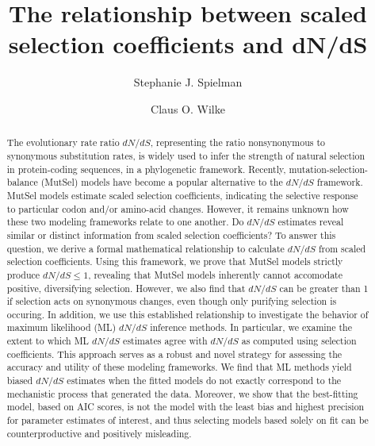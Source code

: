\documentclass[11pt]{article}
\begin{document}
	
	
\title{The relationship between scaled selection coefficients and dN/dS}
	
\author{Stephanie J. Spielman 
	\and
	Claus O. Wilke
}
	

		
\begin{abstract} 
The evolutionary rate ratio $dN/dS$, representing the ratio nonsynonymous to synonymous substitution rates, is widely used to infer the strength of natural selection in protein-coding sequences, in a phylogenetic framework.  Recently, mutation-selection-balance (MutSel) models have become a popular alternative to the $dN/dS$ framework. MutSel models estimate scaled selection coefficients, indicating the selective response to particular codon and/or amino-acid changes. However, it remains unknown how these two modeling frameworks relate to one another. Do $dN/dS$ estimates reveal similar or distinct information from scaled selection coefficients? To answer this question, we derive a formal mathematical relationship to calculate $dN/dS$ from scaled selection coefficients. Using this framework, we prove that MutSel models strictly produce $dN/dS \leq 1$, revealing that MutSel models inherently cannot accomodate positive, diversifying selection. However, we also find that $dN/dS$ can be greater than 1 if selection acts on synonymous changes, even though only purifying selection is occuring. In addition, we use this established relationship to investigate the behavior of maximum likelihood (ML) $dN/dS$ inference methods. In particular, we examine the extent to which ML $dN/dS$ estimates agree with $dN/dS$ as computed using selection coefficients. This approach serves as a robust and novel strategy for assessing the accuracy and utility of these modeling frameworks.  We find that ML methods yield biased $dN/dS$ estimates when the fitted models do not exactly correspond to the mechanistic process that generated the data. Moreover, we show that the best-fitting model, based on AIC scores, is not the model with the least bias and highest precision for parameter estimates of interest, and thus selecting models based solely on fit can be counterproductive and positively misleading. 
\end{abstract}
		
\end{document}
